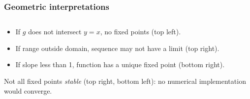 \documentclass{beamer}
\begin{document}
\begin{frame}
  \frametitle{Geometric interpretations}

  \begin{columns}
    \begin{column}{0.5\textwidth}
      \begin{overlayarea}{\textwidth}{0.6\textheight}
        {
          \begin{itemize}
          \item<1-4> If $g$ does not intersect $y=x$, no fixed points (top left).
          \item<2-4> If range outside domain, sequence
            may not have a limit (top right).
          \item<3-4> If slope less than 1, function has a unique
            fixed point (bottom right).
          \end{itemize}
        }
        {
          Not all fixed points \emph{stable} (top right, bottom left): no numerical implementation would converge.
        }




\end{overlayarea}
\end{column}
\end{columns}
\end{frame}
\end{document}
